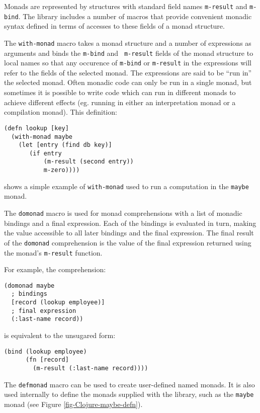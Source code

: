 \documentclass[natbib,10pt]{sigplanconf}
\begin{document}
Monads are represented by structures with standard field names
{\tt m-result} and {\tt m-bind}. The library includes a number of
macros that provide convenient monadic syntax defined in terms
of accesses to these fields of a monad structure.

The {\tt with-monad} macro takes a monad structure and a number of
expressions as arguments and binds the {\tt m-bind} and {\tt
  m-result} fields of the monad structure to local names so that any
occurence of {\tt m-bind} or {\tt m-result} in the expressions
will refer to the fields of the selected monad.  The expressions are
said to be ``run in'' the selected monad.  Often monadic code can only
be run in a single monad, but sometimes it is possible to write code
which can run in different monads to achieve different effects
(eg. running in either an interpretation monad or a compilation
monad).  This definition:
\begin{verbatim}
(defn lookup [key]
  (with-monad maybe
    (let [entry (find db key)]
       (if entry
           (m-result (second entry))
           m-zero))))
\end{verbatim}
shows a simple example of {\tt with-monad} used to run a computation
in the {\tt maybe} monad.

The {\tt domonad} macro is used for monad comprehensions with a list
of monadic bindings and a final expression.  Each of the bindings is
evaluated in turn, making the value accessible to all later bindings
and the final expression.  The final result of the {\tt domonad}
comprehension is the value of the final expression returned using
the monad's {\tt m-result} function.

For example, the comprehension:
\begin{verbatim}
(domonad maybe
  ; bindings
  [record (lookup employee)]
  ; final expression
  (:last-name record))
\end{verbatim}
is equivalent to the unsugared form:
\begin{verbatim}
(bind (lookup employee)
      (fn [record]
        (m-result (:last-name record))))
\end{verbatim}

The {\tt defmonad} macro can be used to create user-defined named
monads.  It is also used internally to define the monads supplied
with the library, such as the {\tt maybe} monad 
(see Figure \ref{fig-Clojure-maybe-defn}).
\end{document}
